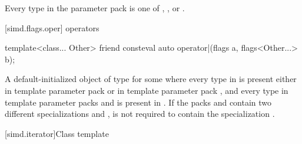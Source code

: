 \pnum
\constraints
Every type in the parameter pack  is one of ,
, or .

[simd.flags.oper]{ operators}

\begin{itemdecl}
template<class... Other>
  friend consteval auto operator|(flags a, flags<Other...> b);
\end{itemdecl}

\begin{itemdescr}
\pnum
\returns
  A default-initialized object of type  for some
   where every type in  is present either in template parameter pack
   or in template parameter pack , and every type in template parameter
  packs  and  is present in .
  If the packs  and  contain two
  different specializations  and
  ,  is not required to contain the
  specialization .
\end{itemdescr}

[simd.iterator]{Class template }

